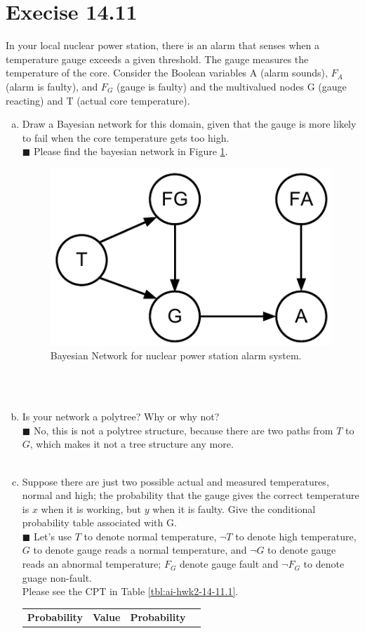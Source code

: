 \documentclass{article}
\newcommand{\solution}[1]{~\\ $\blacksquare$ \sffamily\upshape\selectfont #1
\normalfont ~\\~ }
\begin{document}
\section{Execise 14.11}
In your local nuclear power station, there is an alarm that senses
when a temperature gauge exceeds a given threshold. The gauge measures
the temperature of the core. Consider the Boolean variables A (alarm
sounds), $F_A$ (alarm is faulty), and $F_G$ (gauge is faulty) and the
multivalued nodes G (gauge reacting) and T (actual core temperature).
\begin{enumerate}[a.]
\item Draw a Bayesian network for this domain, given that the gauge is
  more likely to fail when the core temperature gets too high.
\solution{
  Please find the bayesian network in Figure \ref{fig:3}. 
  \begin{figure}[ht]
    \centering
    \includegraphics[width=.3\textwidth]{AI-HWK-2_14_11.pdf}
    \caption{Bayesian Network for nuclear power station alarm system.} 
    \label{fig:3}
  \end{figure} }
\item Is your network a polytree? Why or why not?
\solution{No, this is not a polytree structure, because there are two
  paths from $T$ to $G$, which makes it not a tree structure any more.}
\item Suppose there are just two possible actual and measured
  temperatures, normal and high; the probability that the gauge gives
  the correct temperature is $x$ when it is working, but $y$ when it is
  faulty. Give the conditional probability table associated with G.
  \solution{Let's use $T$ to denote normal temperature, $\neg T$ to
    denote high temperature, $G$ to denote gauge reads a normal
    temperature, and $\neg G$ to denote gauge reads an abnormal
    temperature; $F_G$ denote gauge fault and $\neg F_G$ to denote
    guage non-fault. \\
    Please see the CPT in Table \ref{tbl:ai-hwk2-14-11.1}.
    \begin{table}[h]
      \centering
      \begin{tabular}{lclc}
        \toprule
        \textbf{Probability} & \textbf{Value} & \textbf{Probability} &

\end{tabular}
\end{table}}
\end{enumerate}
\end{document}
